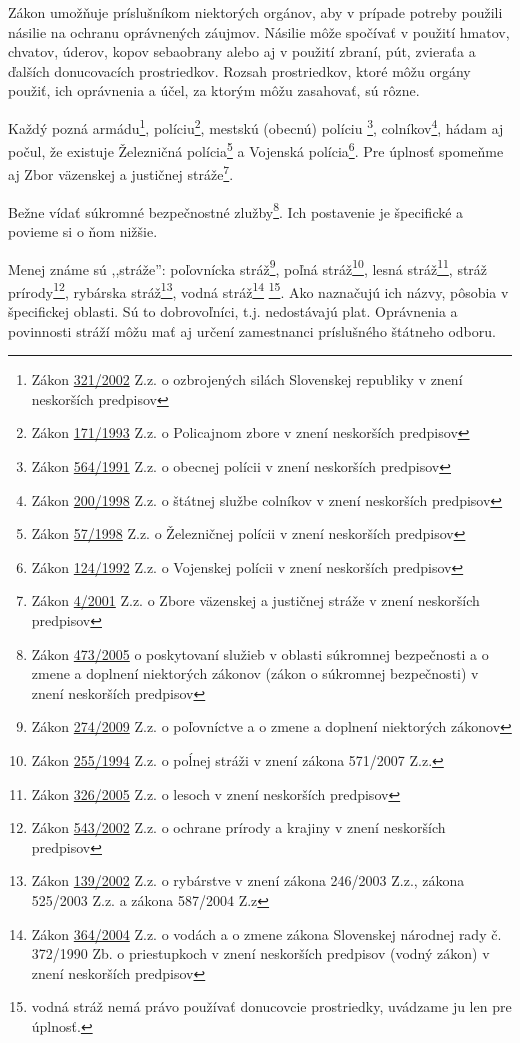 \documentclass[openany]{book}
\newcommand{\zakon}[1]{\href{http://jaspi.justice.gov.sk/jaspiw1/index_jaspi0.asp?MOD=html&FIR=demo&JEL=n&AGE=zak&IDC=#1}{#1}}
\newcommand{\vznp}{v znení neskorších predpisov}
\begin{document}
Zákon umožňuje príslušníkom niektorých orgánov, aby v prípade potreby použili násilie na ochranu oprávnených záujmov. Násilie môže spočívať v použití hmatov, chvatov, úderov, kopov sebaobrany alebo aj v použití zbraní, pút, zvieraťa a ďalších donucovacích prostriedkov. Rozsah prostriedkov, ktoré môžu orgány použiť, ich oprávnenia a účel, za ktorým môžu zasahovať, sú rôzne. 

Každý pozná armádu\footnote{Zákon \zakon{321/2002} Z.z. o ozbrojených silách Slovenskej republiky \vznp}, políciu\footnote{Zákon \zakon{171/1993} Z.z. o Policajnom zbore \vznp}, mestskú (obecnú) políciu \footnote{Zákon \zakon{564/1991} Z.z. o obecnej polícii \vznp}, colníkov\footnote{Zákon \zakon{200/1998} Z.z. o štátnej službe colníkov \vznp}, hádam aj počul, že existuje Železničná polícia\footnote{Zákon \zakon{57/1998} Z.z. o Železničnej polícii \vznp} a Vojenská polícia\footnote{Zákon \zakon{124/1992} Z.z. o Vojenskej polícii \vznp}. Pre úplnosť spomeňme aj Zbor väzenskej a justičnej stráže\footnote{Zákon \zakon{4/2001} Z.z. o Zbore väzenskej a justičnej stráže \vznp}. 

Bežne vídať súkromné bezpečnostné zlužby\footnote{Zákon \zakon{473/2005} o poskytovaní služieb v oblasti súkromnej bezpečnosti a o zmene a doplnení niektorých zákonov (zákon o súkromnej bezpečnosti) \vznp}. Ich postavenie je špecifické a povieme si o ňom nižšie. 

Menej známe sú ,,stráže'': poľovnícka stráž\footnote{Zákon \zakon{274/2009} Z.z. o poľovníctve a o zmene a doplnení niektorých zákonov}, poľná stráž\footnote{Zákon \zakon{255/1994} Z.z.  o poĺnej stráži v znení zákona 571/2007 Z.z. }, lesná stráž\footnote{Zákon \zakon{326/2005} Z.z. o lesoch \vznp}, stráž prírody\footnote{Zákon \zakon{543/2002} Z.z. o ochrane prírody a krajiny \vznp}, rybárska stráž\footnote{Zákon \zakon{139/2002} Z.z. o rybárstve v znení zákona 246/2003 Z.z., zákona 525/2003 Z.z. a zákona 587/2004 Z.z}, vodná stráž\footnote{Zákon \zakon{364/2004} Z.z. o vodách a o zmene zákona Slovenskej národnej rady č. 372/1990 Zb. o priestupkoch v znení neskorších predpisov (vodný zákon) \vznp} \footnote{vodná stráž nemá právo používať donucovcie prostriedky, uvádzame ju len pre úplnosť.}. Ako naznačujú ich názvy, pôsobia v špecifickej oblasti. Sú to dobrovoľníci, t.j. nedostávajú plat. Oprávnenia a povinnosti stráží môžu mať aj určení zamestnanci príslušného štátneho odboru.

\end{document}
